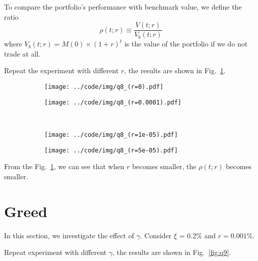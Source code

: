 \documentclass[runningheads]{llncs}
\begin{document}
To compare the portfolio's performance with benchmark value, we define the ratio
\begin{equation}
    \rho(t; r) \equiv \frac{V(t; r)}{V_b(t; r)}
\end{equation}
where $V_b(t; r)=M(0) \times(1+r)^t$ is the value of the portfolio if we do not trade at all.

Repeat the experiment with different $r$, the results are shown in Fig.~\ref{fig:q8}.


\begin{figure}[!htbp]
    \begin{subfigure}[t]{0.49\textwidth}
        \centering
        \texttt{[image: ../code/img/q8\_(r=0).pdf]}
    \end{subfigure}
    \begin{subfigure}[t]{0.49\textwidth}
        \centering
        \texttt{[image: ../code/img/q8\_(r=0.0001).pdf]}
    \end{subfigure}
    ~
    \begin{subfigure}[t]{0.49\textwidth}
        \centering
        \texttt{[image: ../code/img/q8\_(r=1e-05).pdf]}
    \end{subfigure}
    \begin{subfigure}[t]{0.49\textwidth}
        \centering
        \texttt{[image: ../code/img/q8\_(r=5e-05).pdf]}
    \end{subfigure}
    \caption{}
    \label{fig:q8}
\end{figure}

From the Fig.~\ref{fig:q8}, we can see that when $r$ becomes smaller, the $\rho(t;r)$ becomes smaller. 

\section{Greed}\label{sec:9}

In this section, we investigate the effect of $\gamma$. Consider $\xi$ = 0.2\% and $r = 0.001$\%.

Repeat experiment with different $\gamma$, the results are shown in Fig.~\ref{fig:q9}.
\end{document}
